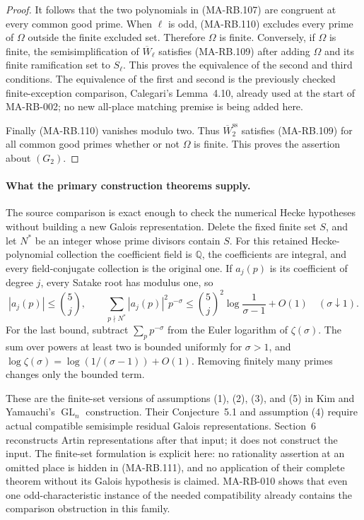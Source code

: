 \begin{proof}
It follows that the two polynomials in (MA-RB.107) are
congruent at every common good prime.  When \(\ell\) is odd,
(MA-RB.110) excludes every prime of \(\Omega\) outside the
finite excluded set.  Therefore \(\Omega\) is finite.
Conversely, if \(\Omega\) is finite, the semisimplification
of \(\overline W_\ell\) satisfies (MA-RB.109) after adding
\(\Omega\) and its finite ramification set to \(S_\ell\).
This proves the equivalence of the second and third
conditions.  The equivalence of the first and second is the
previously checked finite-exception comparison, Calegari's
Lemma~4.10, already used at the start of MA-RB-002; no
new all-place matching premise is being added here.

Finally (MA-RB.110) vanishes modulo two.  Thus
\(\overline W_2^{\mathrm{ss}}\) satisfies (MA-RB.109)
for all common good primes whether or not \(\Omega\)
is finite.  This proves the assertion about \((G_2)\).
\end{proof}

\paragraph{What the primary construction theorems supply.}
The source comparison is exact enough to check the numerical
Hecke hypotheses without building a new Galois representation.
Delete the fixed finite set \(S\), and let \(N^*\) be an integer
whose prime divisors contain \(S\).  For this retained
Hecke-polynomial collection the coefficient field is
\(\mathbb Q\), the coefficients are integral, and every
field-conjugate collection is the original one.
If \(a_j(p)\) is its coefficient of degree \(j\), every
Satake root has modulus one, so
\[
 |a_j(p)|\le \binom{5}{j},\qquad
 \sum_{p\nmid N^*}|a_j(p)|^2p^{-\sigma}
 \le \binom{5}{j}^{\!2}
                   \log\frac1{\sigma-1}+O(1)
                         \quad(\sigma\downarrow1).
 \tag{MA-RB.111}
\]
For the last bound, subtract \(\sum_p p^{-\sigma}\)
from the Euler logarithm of \(\zeta(\sigma)\).
The sum over powers at least two is bounded uniformly
for \(\sigma>1\), and
\(\log\zeta(\sigma)=\log(1/(\sigma-1))+O(1)\).
Removing finitely many primes changes only the bounded term.

These are the finite-set versions of assumptions (1), (2),
(3), and (5) in Kim and Yamauchi's \(\operatorname{GL}_n\)
construction.  Their Conjecture~5.1 and assumption (4) require
actual compatible semisimple residual Galois representations.
Section~6 reconstructs Artin representations after that input;
it does not construct the input.  The finite-set formulation
is explicit here: no rationality assertion at an omitted place
is hidden in (MA-RB.111), and no application of their complete
theorem without its Galois hypothesis is claimed.
MA-RB-010 shows that even one odd-characteristic instance of
the needed compatibility already contains the comparison
obstruction in this family.

